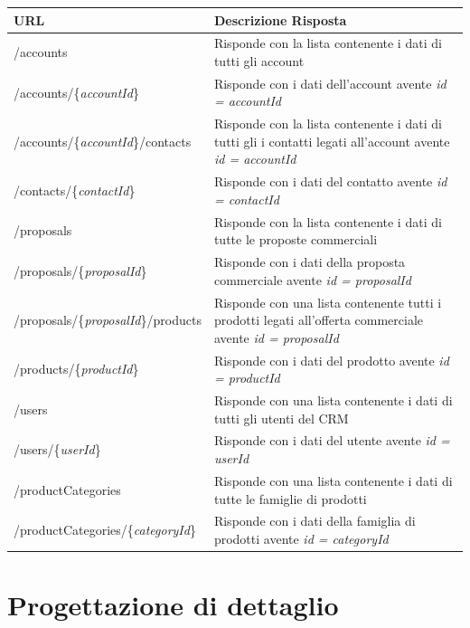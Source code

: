 	\begin{small}
		\begin{longtable}{ | l | p{8cm} | }
			\hline \textbf{URL} & \textbf{Descrizione Risposta}\\
			\hline /accounts & Risponde con la lista contenente i dati di tutti gli account\\
			\hline /accounts/\{\textit{accountId}\} & Risponde con i dati dell'account avente \textit{id = accountId}\\    
			\hline /accounts/\{\textit{accountId}\}/contacts & Risponde con la lista contenente i dati di tutti gli i contatti legati all'account avente \textit{id = accountId}\\
			\hline /contacts/\{\textit{contactId}\} & Risponde con i dati del contatto avente \textit{id = contactId}\\
			\hline /proposals & Risponde con la lista contenente i dati di tutte le proposte commerciali\\
			\hline /proposals/\{\textit{proposalId}\} & Risponde con i dati della proposta commerciale avente \textit{id = proposalId}\\    
			\hline /proposals/\{\textit{proposalId}\}/products & Risponde con una lista contenente tutti i prodotti legati all'offerta commerciale avente \textit{id =  proposalId}\\
			\hline /products/\{\textit{productId}\} & Risponde con i dati del prodotto avente \textit{id = productId}\\
			\hline /users & Risponde con una lista contenente i dati di tutti gli utenti del CRM\\
			\hline /users/\{\textit{userId}\} & Risponde con i dati del utente avente \textit{id = userId}\\    
			\hline /productCategories & Risponde con una lista contenente i dati di tutte le famiglie di prodotti\\
			\hline /productCategories/\{\textit{categoryId}\} & Risponde con i dati della famiglia di prodotti avente \textit{id = categoryId}\\		
			\hline 
		\end{longtable}		
	\end{small}
	
\section{Progettazione di dettaglio}


